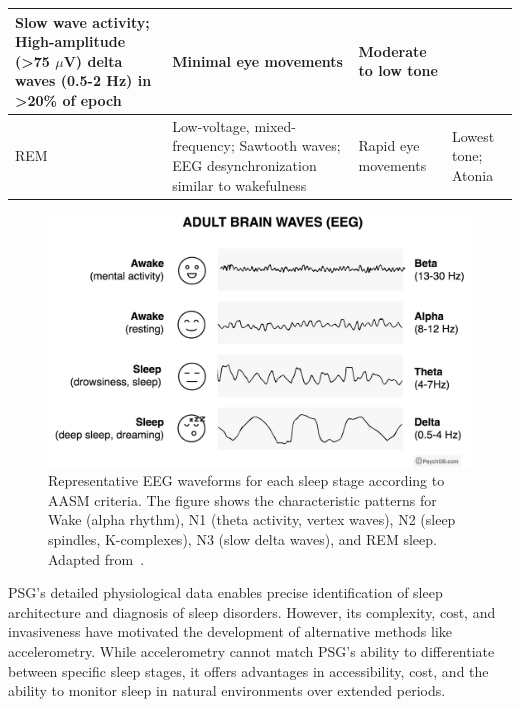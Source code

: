 \documentclass[conference]{IEEEtran}
\begin{document}
\begin{table}[h]
{\begin{tabular}{|p{1.5cm}|p{4.5cm}|p{3.5cm}|p{3cm}|}
			Slow wave activity; High-amplitude (\textgreater75 $\mu$V) delta waves (0.5-2 Hz) in \textgreater20\% of epoch &
			Minimal eye movements                                                                                          &
			Moderate to low tone                                                                                                                                                        \\
			\hline
			REM                                                                                                            &
			Low-voltage, mixed-frequency; Sawtooth waves; EEG desynchronization similar to wakefulness                     &
			Rapid eye movements                                                                                            &
			Lowest tone; Atonia                                                                                                                                                         \\
			\hline
		\end{tabular}%
	}
\end{table}

\begin{figure}[h]
	\centering
	\includegraphics[width=0.65\linewidth]{figures/sleep_stages_eeg_patterns.png}
	\caption{Representative EEG waveforms for each sleep stage according to AASM criteria. The figure shows the characteristic patterns for Wake (alpha rhythm), N1 (theta activity, vertex waves), N2 (sleep spindles, K-complexes), N3 (slow delta waves), and REM sleep. Adapted from~\cite{psychdb2023}.}
	\label{fig:sleep_stages_eeg}
\end{figure}

PSG's detailed physiological data enables precise identification of sleep architecture and diagnosis of sleep disorders. However, its complexity, cost, and invasiveness have motivated the development of alternative methods like accelerometry. While accelerometry cannot match PSG's ability to differentiate between specific sleep stages, it offers advantages in accessibility, cost, and the ability to monitor sleep in natural environments over extended periods.
\end{document}
